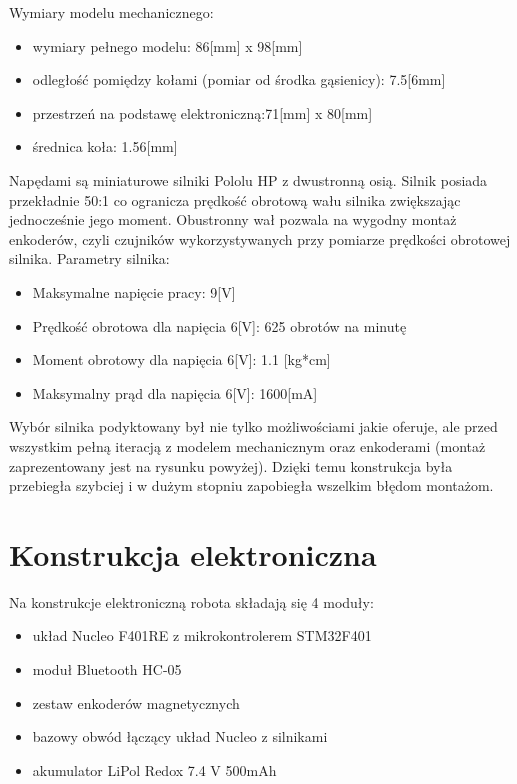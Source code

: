 \documentclass[eng,printmode]{mgr}
\begin{document}
Wymiary modelu mechanicznego:
\begin{itemize}
  \item wymiary pełnego modelu: 86[mm] x 98[mm]
  \item odległość pomiędzy kołami (pomiar od środka gąsienicy): 7.5[6mm]
  \item przestrzeń na podstawę elektroniczną:71[mm] x 80[mm]
  \item średnica koła: 1.56[mm]
\end{itemize}

Napędami są miniaturowe silniki Pololu HP z dwustronną osią. Silnik posiada przekładnie 50:1 co ogranicza prędkość obrotową wału silnika zwiększając jednocześnie jego moment. Obustronny wał pozwala na wygodny montaż enkoderów, czyli czujników wykorzystywanych przy pomiarze prędkości obrotowej silnika. Parametry silnika:

\begin{itemize}
  \item Maksymalne napięcie pracy: 9[V]
  \item Prędkość obrotowa dla napięcia 6[V]: 625 obrotów na minutę
  \item Moment obrotowy dla napięcia 6[V]: 1.1 [kg*cm]
  \item Maksymalny prąd dla napięcia 6[V]: 1600[mA]
\end{itemize}

Wybór silnika podyktowany był nie tylko możliwościami jakie oferuje, ale przed wszystkim pełną iteracją z modelem mechanicznym oraz enkoderami (montaż zaprezentowany jest na rysunku powyżej). Dzięki temu konstrukcja była przebiegła szybciej i w dużym stopniu zapobiegła wszelkim błędom montażom. 

 \section{Konstrukcja elektroniczna}
Na konstrukcje elektroniczną robota składają się 4 moduły:
\begin{itemize}
  \item układ Nucleo F401RE z mikrokontrolerem STM32F401
  \item moduł Bluetooth HC-05
  \item zestaw enkoderów magnetycznych 
  \item bazowy obwód łączący układ Nucleo z silnikami 
  \item akumulator LiPol Redox 7.4 V 500mAh
\end{itemize}
\end{document}

